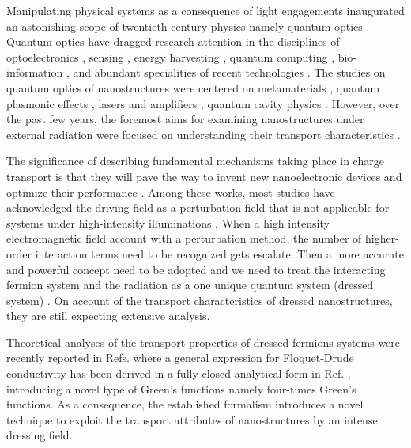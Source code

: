 
Manipulating physical systems as a consequence of light engagements inaugurated an astonishing scope of twentieth-century physics namely quantum optics \cite{grynberg10}.
Quantum optics have dragged research attention in the disciplines of optoelectronics \cite{liu16,wijesekara20,tao21}, sensing \cite{rodrigo2015,pirandola18,hapuarachchi2018}, energy harvesting \cite{yuan16,sun18},
quantum computing \cite{huh15,slussarenko19,andersen21}, bio-information \cite{marais18,bian20}, and abundant specialities of recent technologies \cite{rivera20}.
The studies on quantum optics of nanostructures were centered on metamaterials \cite{shalaev07,si14}, quantum plasmonic effects \cite{hapuarachchi19,perera20}, lasers and amplifiers \cite{zhang05,chow13}, quantum cavity physics \cite{tsang10,devi20}.
However, over the past few years, the foremost aims for examining nanostructures under external radiation were focused on understanding their transport characteristics \cite{kitagawa11,zhou11,kibis14,pervishko15,morina15,dehghani15,dini16,wackerl20}.

The significance of describing fundamental mechanisms taking place in charge transport is that they will pave the way to invent new nanoelectronic devices and optimize their performance \cite{premaratne21}.
Among these works, most studies have acknowledged the driving field as a perturbation field \cite{pervishko15,morina15} that is not applicable for systems under high-intensity illuminations \cite{grifoni98,wackerl20}.
When a high intensity electromagnetic field account with a perturbation method, the number of higher-order interaction terms need to be recognized gets escalate. Then a more accurate and powerful concept need to be adopted and we need to treat the interacting fermion system and the radiation as a one unique quantum system (dressed system) \cite{morina15,cohen98,scully01}. On account of the transport characteristics of dressed nanostructures, they are still expecting extensive analysis.

Theoretical analyses of the transport properties of dressed fermions systems were recently reported in Refs. \cite{kibis14,morina15,wackerl20} where a general expression for Floquet-Drude conductivity has been derived in a fully closed analytical form in Ref. \cite{wackerl20}, introducing a novel type of Green’s functions namely four-times Green’s functions. As a consequence, the established formalism introduces a novel technique to exploit the transport attributes of nanostructures by an intense dressing field.

